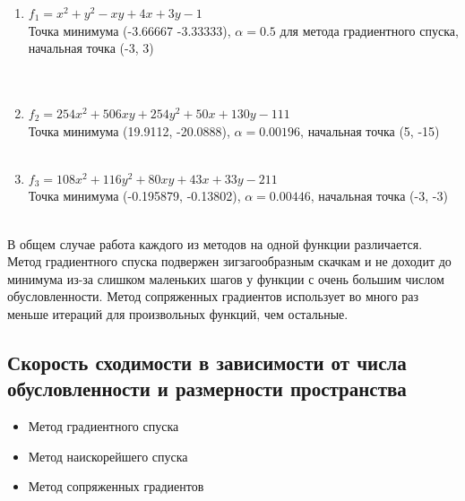 	\begin{enumerate}
		\item \(f_1 = x^2 + y^2 - xy + 4x + 3y - 1\) \\
		Точка минимума (-3.66667 -3.33333), $\alpha = 0.5$ для метода градиентного спуска, начальная точка (-3, 3) \\
		\\
		\\[5mm]
		
		
		\item \(f_2 = 254x^2 + 506xy + 254y^2 + 50x + 130y - 111\) \\
		Точка минимума (19.9112, -20.0888), $\alpha = 0.00196$,
		начальная точка (5, -15)\\
		\\[5mm]
		
		\item \(f_3 = 108x^2 + 116y^2 + 80xy + 43x + 33y - 211\) \\
		Точка минимума (-0.195879, -0.13802), $\alpha = 0.00446$,
		начальная точка (-3, -3)  \\
		 \\[5mm]
		
		
	\end{enumerate}
	
	В общем случае работа каждого из методов на одной функции различается. Метод градиентного спуска подвержен зигзагообразным скачкам и не доходит до минимума из-за слишком маленьких шагов у функции с очень большим числом обусловленности. Метод сопряженных градиентов использует во много раз меньше итераций для произвольных функций, чем остальные.
	
	\subsection{Скорость сходимости в зависимости от числа обусловленности и размерности пространства}
	
	\begin{itemize}
		\item Метод градиентного спуска
		
		\item Метод наискорейшего спуска
		
		\item Метод сопряженных градиентов
	\end{itemize}

